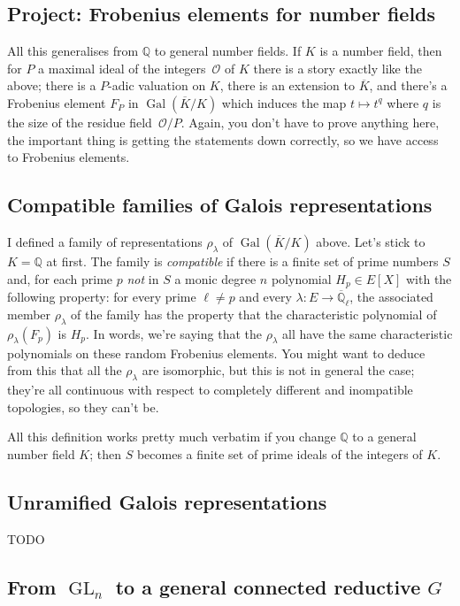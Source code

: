 \documentclass{amsart}
\newcommand{\Q}{\mathbb{Q}}
\DeclareMathOperator{\GL}{GL}
\DeclareMathOperator{\Gal}{Gal}
\begin{document}
\subsection{Project: Frobenius elements for number fields}

All this generalises from $\Q$ to general number fields. If $K$ is a number field, then for $P$ a maximal ideal of the integers~$\mathcal{O}$ of $K$ there is a story exactly like the above; there is a $P$-adic valuation on $K$, there is an extension to $\overline{K}$, and there's a Frobenius element $F_P$ in $\Gal(\overline{K}/K)$ which induces the map $t\mapsto t^q$ where $q$ is the size of the residue field~$\mathcal{O}/P$. Again, you don't have to prove anything here, the important thing is getting the statements down correctly, so we have access to Frobenius elements.

\subsection{Compatible families of Galois representations}

I defined a family of representations $\rho_\lambda$ of $\Gal(\overline{K}/K)$ above. Let's stick to $K=\Q$ at first. The family is \emph{compatible} if there is a finite set of prime numbers $S$ and, for each prime $p$ \emph{not} in $S$ a monic degree $n$ polynomial $H_p\in E[X]$ with the following property: for every prime $\ell\not=p$ and every $\lambda : E\to\overline{\Q}_\ell$, the associated member $\rho_\lambda$ of the family has the property that the characteristic polynomial of $\rho_{\lambda}(F_p)$ is $H_p$. In words, we're saying that the $\rho_\lambda$ all have the same characteristic polynomials on these random Frobenius elements. You might want to deduce from this that all the $\rho_\lambda$ are isomorphic, but this is not in general the case; they're all continuous with respect to completely different and inompatible topologies, so they can't be.

All this definition works pretty much verbatim if you change $\Q$ to a general number field $K$; then $S$ becomes a finite set of prime ideals of the integers of $K$.

\subsection{Unramified Galois representations}

TODO

\subsection{From $\GL_n$ to a general connected reductive $G$}
\end{document}

